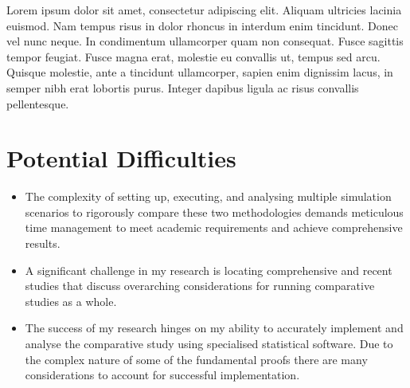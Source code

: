 \medskip

Lorem ipsum dolor sit amet, consectetur adipiscing elit. Aliquam ultricies lacinia euismod. Nam tempus risus in dolor rhoncus in interdum enim tincidunt. Donec vel nunc neque. In condimentum ullamcorper quam non consequat. Fusce sagittis tempor feugiat. Fusce magna erat, molestie eu convallis ut, tempus sed arcu. Quisque molestie, ante a tincidunt ullamcorper, sapien enim dignissim lacus, in semper nibh erat lobortis purus. Integer dapibus ligula ac risus convallis pellentesque. 

\section{Potential Difficulties}


\begin{itemize}
	\item The complexity of setting up, executing, and analysing multiple simulation scenarios to rigorously compare these two methodologies demands meticulous time management to meet academic requirements and achieve comprehensive results.
	\item A significant challenge in my research is locating comprehensive and recent studies that discuss overarching considerations for running comparative studies as a whole.
	\item The success of my research hinges on my ability to accurately implement and analyse the comparative study using specialised statistical software. Due to the complex nature of some of the fundamental proofs there are many considerations to account for successful implementation.
\end{itemize}


